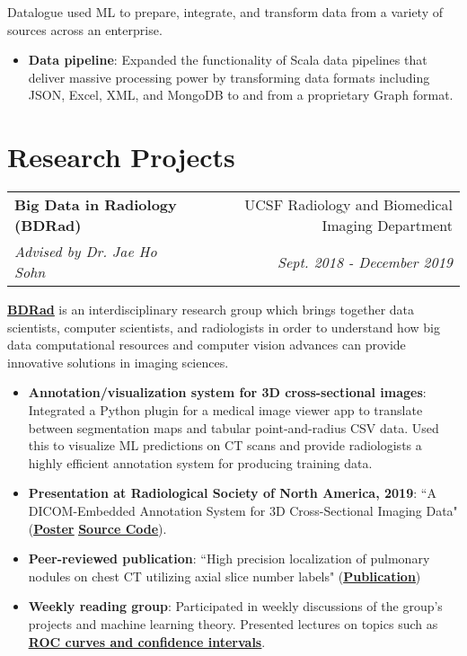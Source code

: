\documentclass[letterpaper,11pt]{article}
\makeatletter
\newcommand{\resumeItem}[2]{
  \item\small{
    \textbf{#1}{: #2 \vspace{-2pt}}
  }
}
\newcommand{\resumeSubheading}[4]{
  \vspace{-1pt}
    \begin{tabular*}{0.97\textwidth}{l@{\extracolsep{\fill}}r}
      \textbf{#1} & #2 \\
      \textit{\small#3} & \textit{\small #4} \\
    \end{tabular*}\vspace{-5pt}
}
\newcommand{\resumeSubItem}[2]{\resumeItem{#1}{#2}\vspace{-4pt}}
\newcommand{\resumeSubHeadingListStart}{\begin{itemize}[leftmargin=*]}
\newcommand{\resumeSubHeadingListEnd}{\end{itemize}}
\newcommand{\resumeItemListStart}{\begin{itemize}}
\newcommand{\resumeItemListEnd}{\end{itemize}\vspace{-5pt}}
\makeatother
\begin{document}
          \vspace{4mm}
Datalogue used ML to prepare, integrate, and transform data from a variety of sources across an enterprise. 
      \resumeItemListStart
        \resumeItem{Data pipeline}
      {Expanded the functionality of Scala data pipelines that deliver massive processing power by transforming data formats including JSON, Excel, XML, and MongoDB to and from a proprietary Graph format.}
      \resumeItemListEnd

\section{Research Projects}
    \resumeSubheading
      {Big Data in Radiology (BDRad)}{UCSF Radiology and Biomedical Imaging Department}
      {Advised by Dr. Jae Ho Sohn}{Sept. 2018 - December 2019}
      
      \vspace{4mm}
      \href{https://radiology.ucsf.edu/research/labs/physics/big-data}{\textbf{\underline{BDRad}}} is an interdisciplinary research group which brings together data scientists, computer scientists, and radiologists in order to understand how big data computational resources and computer vision advances can provide innovative solutions in imaging sciences.
      
  \resumeSubHeadingListStart
    \resumeSubItem{Annotation/visualization system for 3D cross-sectional images}
      {Integrated a Python plugin for a medical image viewer app to translate between segmentation maps and tabular point-and-radius CSV data. Used this to visualize ML predictions on CT scans and provide radiologists a highly efficient annotation system for producing training data.}
    \resumeSubItem{Presentation at Radiological Society of North America, 2019}{``A DICOM-Embedded Annotation System for 3D Cross-Sectional Imaging Data" (\href{https://github.com/bdrad/pyOsirixScripts/blob/master/rsna2019_poster_aarash.pdf}{\underline{\textbf{Poster}}} \textbar \hspace{0.5mm} \href{https://github.com/aarashy/dicom-viewer}{\underline{\textbf{Source Code}}}).}
    \resumeSubItem{Peer-reviewed publication} {``High precision localization of pulmonary nodules on chest CT utilizing axial slice number labels" (\href{https://link.springer.com/article/10.1186/s12880-021-00594-4}{\underline{\textbf{Publication}}})}
    \resumeSubItem{Weekly reading group}
      {Participated in weekly discussions of the group's projects and machine learning theory. Presented  lectures on topics such as \href{https://docs.google.com/presentation/d/1bq07GSe7ilcrZInrKemy1EVERqXM25jV_axE1Uhba-c/edit?usp=sharing}{\textbf{\underline{ROC curves and confidence intervals}}}.}
    \resumeSubHeadingListEnd
    
\end{document}
